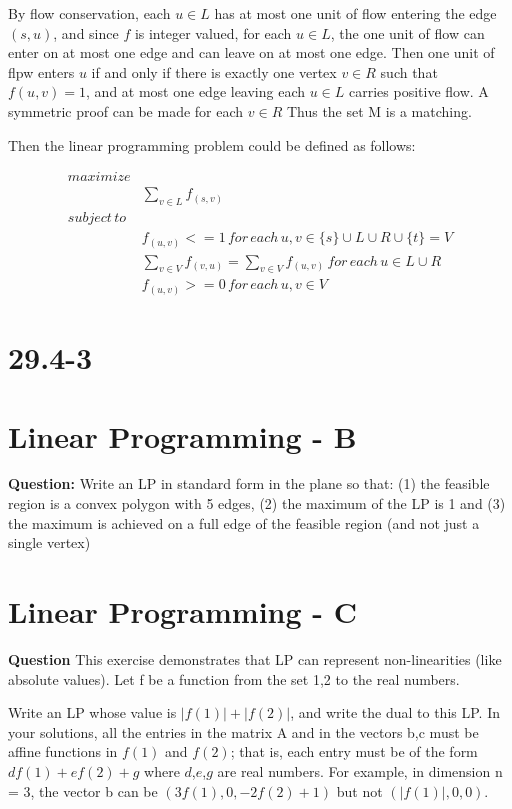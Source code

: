 \documentclass[12pt]{article}
\begin{document}
By flow conservation, each $u \in L$ has at most one unit of flow entering the edge $(s,u)$, and since $f$ is integer valued, for each $u \in L$, the one unit of flow can enter on at most one edge and can leave on at most one edge. Then one unit of flpw enters $u$ if and only if there is exactly one vertex $v \in R$ such that $f(u,v) = 1$, and at most one edge leaving each $u \in L$ carries positive flow. A symmetric proof can be made for each $v \in R$ Thus the set M is a matching.

Then the linear programming problem could be defined as follows:

\begin{equation}
\begin{aligned}
maximize& \\
& \sum_{v \in L} f_{(s,v)}\\
subject \, to&  \\
& f_{(u,v)} <=1 \, for \, each \, u,v \in \{s\} \cup L \cup R \cup \{t\} = V\\
& \sum_{v \in V} f_{(v,u)} = \sum_{v \in V} f_{(u,v)} \, for \, each \, u \in L \cup R\\
&f_{(u,v)} >= 0 \, for \,each \, u,v \in V
\end{aligned}
\end{equation}


\section{29.4-3}

\section{Linear Programming - B}
\textbf{Question:}
Write an LP in standard form in the plane so that: (1) the feasible region is a convex polygon with 5 edges, (2) the maximum of the LP is 1 and (3) the maximum is achieved on a full edge of the feasible region (and not just a single vertex)

\section{Linear Programming - C}
\textbf{Question}
This exercise demonstrates that LP can represent non-linearities (like absolute values). Let f be a function from the set {1,2} to the real numbers. 

Write an LP whose value is $|f(1)|+|f(2)|$, and write the dual to this LP. In your solutions, all the entries in the matrix A and in the vectors b,c must be affine functions in $f(1)$ and $f(2)$; that is, each entry must be of the form $d f(1) + e f(2) + g$ where $d$,$e$,$g$ are real numbers. For example, in dimension n = 3, the vector b can be $(3 f(1), 0, -2f(2)+1)$ but not $(|f(1)|,0,0)$. 
\end{document}
